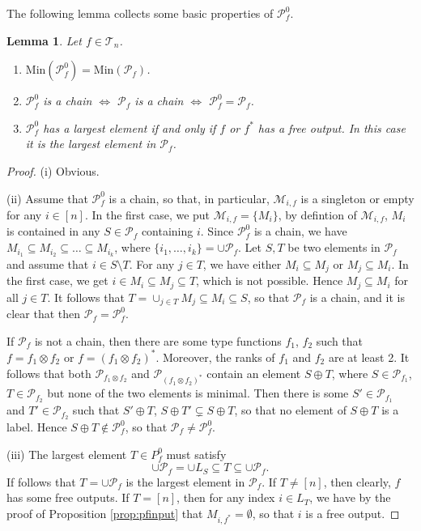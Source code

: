 \documentclass[12pt]{article}
\newtheorem{lemma}{Lemma}
\theoremstyle{definition}
\theoremstyle{remark}
\def\Me{\mathcal M}
\def\Te{\mathcal T}
\def\Pe{\mathcal P}
\begin{document}
The following lemma collects some basic properties of $\Pe_f^0$.


\begin{lemma}\label{lemma:p0_basic} Let $f\in \Te_n$.
\begin{enumerate}
\item[(i)] $\mathrm{Min}(\Pe_f^0)=\mathrm{Min}(\Pe_f)$.
\item[(ii)] $\Pe_f^0$ is a chain $\iff$  $\Pe_f$ is a chain $\iff$  $\Pe_f^0=\Pe_f$.

\item[(iii)] $\Pe^0_f$ has a largest element if and only if $f$ or $f^*$ has a free
output. In this case  it is the largest element in $\Pe_f$. 

\end{enumerate}
\end{lemma}


\begin{proof} 
(i) Obvious. 

(ii) Assume that $\Pe^0_f$ is a chain, so that, in particular,
 $\Me_{i,f}$ is a singleton or empty for any $i\in [n]$. In the first case, we put
 $\Me_{i,f}=\{M_i\}$, by defintion of $\Me_{i,f}$, $M_i$ is contained in any $S\in \Pe_f$ containing $i$.
Since
$\Pe^0_f$ is a chain, we have $M_{i_1}\subseteq M_{i_2}\subseteq\dots\subseteq M_{i_k}$,
where $\{i_1,\dots,i_k\}=\cup \Pe_f$.  Let $S,T$ be two
elements in $\Pe_f$ and assume that $i\in S\setminus T$. For any $j\in T$, we have either
$M_i\subseteq M_j$ or $M_j\subseteq M_i$. In the first case, we get $i\in M_i\subseteq
M_j\subseteq T$, which is not possible. Hence $M_j\subseteq M_i$ for all $j\in T$. It
follows that $T=\cup_{j\in T} M_j\subseteq M_i\subseteq S$, so that $\Pe_f$ is a chain,
and it is clear that then $\Pe_f=\Pe_f^0$. 

If $\Pe_f$ is not a chain, then there are some type
functions
$f_1$, $f_2$ such that $f=f_1\otimes f_2$ or $f=(f_1\otimes f_2)^*$. Moreover, the ranks
of $f_1$ and $f_2$ are at least 2. It follows that both $\Pe_{f_1\otimes f_2}$ and
$\Pe_{(f_1\otimes f_2)^*}$ contain an element $S\oplus T$, where $S\in \Pe_{f_1}$, $T\in
\Pe_{f_2}$ but none of the two elements is minimal. Then there is some $S'\in \Pe_{f_1}$
and $T'\in \Pe_{f_2}$ such that $S'\oplus T$, $S\oplus T'\subsetneq S\oplus T$, so that no
element of $S\oplus T$ is a label. Hence
$S\oplus T\notin
\Pe_f^0$, so that $\Pe_f\ne \Pe_f^0$. 

(iii) The largest element  $T\in P^0_f$ must satisfy 
\[
\cup\Pe_f=\cup L_S \subseteq T\subseteq \cup \Pe_f.
\]
 If follows that $T=\cup\Pe_f $ is the largest element in $\Pe_f$. If $T\ne [n]$, then
 clearly, $f$ has some free outputs. If $T=[n]$, then for any index $i\in L_T$, we have by
 the proof of Proposition \ref{prop:pfinput} that
 $M_{i,f^*}=\emptyset$, so that $i$ is a free output. 




\end{proof}
\end{document}

